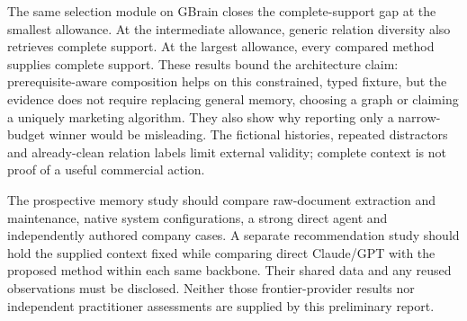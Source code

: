 The same selection module on GBrain closes the complete-support gap at the smallest allowance. At the intermediate allowance, generic relation diversity also retrieves complete support. At the largest allowance, every compared method supplies complete support. These results bound the architecture claim: prerequisite-aware composition helps on this constrained, typed fixture, but the evidence does not require replacing general memory, choosing a graph or claiming a uniquely marketing algorithm. They also show why reporting only a narrow-budget winner would be misleading. The fictional histories, repeated distractors and already-clean relation labels limit external validity; complete context is not proof of a useful commercial action.

The prospective memory study should compare raw-document extraction and maintenance, native system configurations, a strong direct agent and independently authored company cases. A separate recommendation study should hold the supplied context fixed while comparing direct Claude/GPT with the proposed method within each same backbone. Their shared data and any reused observations must be disclosed. Neither those frontier-provider results nor independent practitioner assessments are supplied by this preliminary report.
